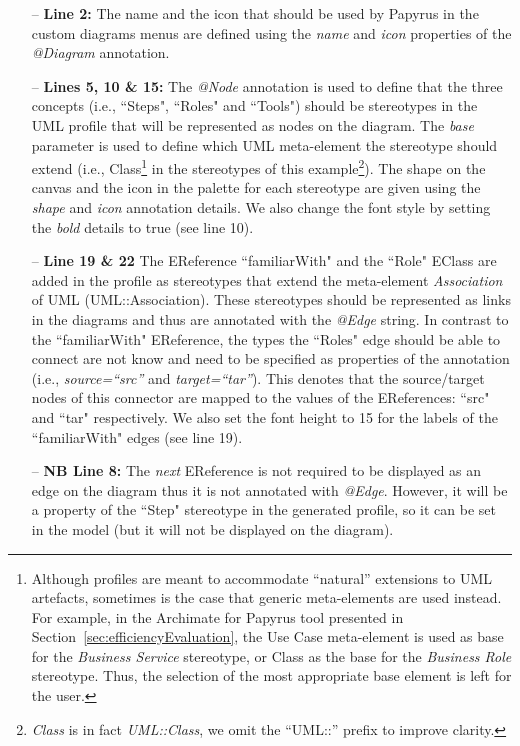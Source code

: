 \begin{itemize}
	\item[--] \textbf{Line 2:} The name and the icon that should be used by Papyrus in the custom diagrams menus are defined using the \textit{name} and \textit{icon} properties of the \textit{@Diagram} annotation.
	\item[--] \textbf{Lines 5, 10 \& 15:} The \textit{@Node} annotation is used to define that the three concepts (i.e., ``Steps", ``Roles" and ``Tools") should be stereotypes in the UML profile that will be represented as nodes on the diagram. 
	The \textit{base} parameter is used to define which UML meta-element the stereotype should extend (i.e., Class\footnote{Although profiles are meant to accommodate ``natural'' extensions to UML artefacts, sometimes is the case that generic meta-elements are used instead. 
	For example, in the Archimate for Papyrus tool presented in Section~\ref{sec:efficiencyEvaluation}, the Use Case meta-element is used as base for the \textit{Business Service} stereotype, or Class as the base for the \textit{Business Role} stereotype. 
	Thus, the selection of the most appropriate base element is left for the user.} in the stereotypes of this example\footnote{\textit{Class} is in fact \textit{UML::Class}, we omit the ``UML::'' prefix to improve clarity.}). The shape on the canvas and the icon in the palette for each stereotype are given using the \textit{shape} and \textit{icon} annotation details. We also change the font style by setting the \textit{bold} details to true (see line 10).
	\item[--] \textbf{Line 19 \& 22} The EReference ``familiarWith" and the ``Role" EClass are added in the profile as stereotypes that extend the meta-element \textit{Association} of UML (UML::Association). 
	These stereotypes should be represented as links in the diagrams and thus are annotated with the \textit{@Edge} string.
	In contrast to the ``familiarWith" EReference, the types the 
	``Roles" edge should be able to connect are not know and need to be 
	specified as properties of the annotation (i.e., \textit{source=``src''} 
	and \textit{target=``tar''}). 
	This denotes that the source/target nodes of this connector are mapped to the values of the
	EReferences: ``src" and ``tar" respectively. 
	We also set the font height to 15 for the labels of the ``familiarWith" edges (see line 19).
	\item[--] \textbf{NB Line 8:} The \textit{next} EReference is not required to be displayed as an edge on the diagram thus it is not annotated with \emph{@Edge}. 
	However, it will be a property of the ``Step" stereotype in the generated profile, so it can be set in the model (but it will not be displayed on the diagram).
\end{itemize}


